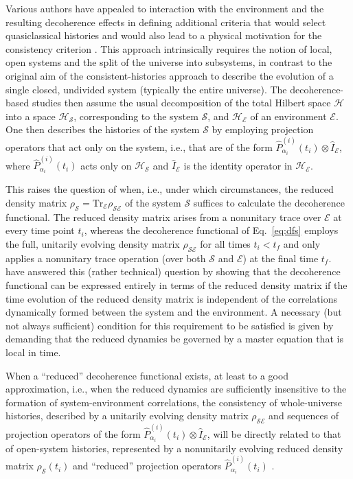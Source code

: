 \documentclass[rmp,aps,amsmath,amsfonts,noshowkeys,noshowpacs,12pt]{revtex4}
\begin{document}
Various authors have appealed to  interaction with the environment
and the resulting decoherence effects in defining additional criteria
that would select quasiclassical histories and would also lead to a
physical motivation for the consistency criterion \citep[see, for
example,][]{GellMann:1990:uz,Dowker:1992:vz,Albrecht:1992:rz,%
Albrecht:1993:pq,Zurek:1993:pu,Paz:1993:ww,Twamley:1993:bz,%
Finkelstein:1993:gc,Anastopoulos:1996:kl,GellMann:1998:xy,Halliwell:2001:qp}.
This approach intrinsically requires the notion of local, open systems
and the split of the universe into subsystems, in contrast to the
original aim of the consistent-histories approach to describe the
evolution of a single closed, undivided system (typically the entire
universe). The decoherence-based studies then assume the usual
decomposition of the total Hilbert space $\mathcal{H}$ into a space
$\mathcal{H}_\mathcal{S}$, corresponding to the system $\mathcal{S}$,
and $\mathcal{H}_\mathcal{E}$ of an environment $\mathcal{E}$. One
then describes the histories of the system $\mathcal{S}$ by employing
projection operators that act only on the system, i.e., that are of
the form $\widehat{P}^{(i)}_{\alpha_i}(t_i) \otimes
\widehat{I}_\mathcal{E}$, where $\widehat{P}^{(i)}_{\alpha_i}(t_i)$
acts only on $\mathcal{H}_\mathcal{S}$ and $\widehat{I}_\mathcal{E}$
is the identity operator in $\mathcal{H}_\mathcal{E}$.

This raises the question of when, i.e., under which circumstances, the
reduced density matrix $\rho_\mathcal{S} = \text{Tr}_\mathcal{E}
\rho_\mathcal{SE}$ of the system $\mathcal{S}$ suffices to calculate
the decoherence functional. The reduced density matrix arises from a
nonunitary trace over $\mathcal{E}$ at every time point $t_i$, whereas
the decoherence functional of Eq.~\eqref{eq:dfs} employs the full,
unitarily evolving density matrix $\rho_\mathcal{SE}$ for all times
$t_i < t_f$ and only applies a nonunitary trace operation (over both
$\mathcal{S}$ and $\mathcal{E}$) at the final time $t_f$.
\citet{Paz:1993:ww} have answered this (rather technical) question by
showing that the decoherence functional can be expressed entirely in
terms of the reduced density matrix if the time evolution of the
reduced density matrix is independent of the correlations dynamically
formed between the system and the environment. A necessary (but not
always sufficient) condition for this requirement to be satisfied is
given by demanding that the reduced dynamics be governed by a master
equation that is local in time.

When a ``reduced'' decoherence functional exists, at least to a good
approximation, i.e., when the reduced dynamics are sufficiently
insensitive to the formation of system-environment correlations, the
consistency of whole-universe histories, described by a unitarily
evolving density matrix $\rho_\mathcal{SE}$ and sequences of
projection operators of the form $\widehat{P}^{(i)}_{\alpha_i}(t_i)
\otimes \widehat{I}_\mathcal{E}$, will be directly related to that of
open-system histories, represented by a nonunitarily evolving reduced
density matrix $\rho_\mathcal{S}(t_i)$ and ``reduced'' projection
operators $\widehat{P}^{(i)}_{\alpha_i}(t_i)$ \citep{Zurek:1993:pu}.
\end{document}
